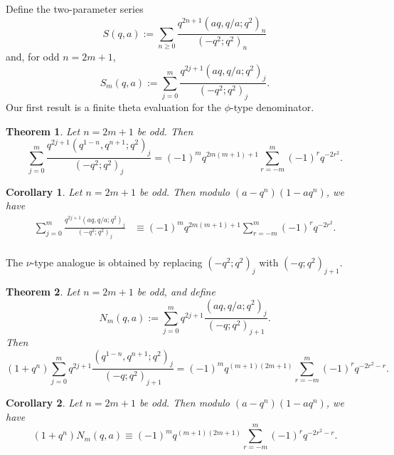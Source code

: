 \documentclass[reqno]{amsart}
\theoremstyle{definition}
\theoremstyle{plain}
\newtheorem{theorem}{Theorem}
\newtheorem{corollary}{Corollary}
\theoremstyle{remark}
\numberwithin{equation}{section}
\begin{document}
Define the two-parameter series
\begin{equation}\label{eq:Sa}
S(q,a):=\sum_{n\ge 0}\frac{q^{2n+1}(aq,q/a;q^2)_n}{(-q^2;q^2)_n}
\end{equation}
and, for odd $n=2m+1$,
\[
S_m(q,a):=\sum_{j=0}^{m}\frac{q^{2j+1}(aq,q/a;q^2)_j}{(-q^2;q^2)_j}.
\]
Our first result is a finite theta evaluation for the $\phi$-type denominator.

\begin{theorem}\label{thm:finite-theta}
Let $n=2m+1$ be odd. Then
\begin{equation}\label{eq:finite-theta}
\sum_{j=0}^{m}\frac{q^{2j+1}(q^{1-n},q^{n+1};q^2)_j}{(-q^2;q^2)_j}
= (-1)^m q^{2m(m+1)+1}\sum_{r=-m}^{m}(-1)^r q^{-2r^2}.
\end{equation}
\end{theorem}

\begin{corollary}\label{cor:microS}
Let $n=2m+1$ be odd. Then modulo $(a-q^n)(1-aq^n)$, we have
\begin{equation}\label{eq:micro-S}
\begin{aligned}
\sum_{j=0}^{m}\frac{q^{2j+1}(aq,q/a;q^2)_j}{(-q^2;q^2)_j}
&\equiv (-1)^m q^{2m(m+1)+1}\sum_{r=-m}^{m}(-1)^r q^{-2r^2}.\\
\end{aligned}
\end{equation}
\end{corollary}

The $\nu$-type analogue is obtained by replacing $(-q^2;q^2)_j$ with $(-q;q^2)_{j+1}$.

\begin{theorem}\label{thm:nu-finite-theta}
Let $n=2m+1$ be odd, and define
\[
N_m(q,a):=\sum_{j=0}^{m} q^{2j+1}\frac{(aq,q/a;q^2)_j}{(-q;q^2)_{j+1}}.
\]
Then
\begin{equation}\label{eq:nu-finite-theta}
(1+q^n)\sum_{j=0}^{m} q^{2j+1}
\frac{(q^{1-n},q^{n+1};q^2)_j}{(-q;q^2)_{j+1}}
=
(-1)^m q^{(m+1)(2m+1)}
\sum_{r=-m}^{m} (-1)^r q^{-2r^2-r}.
\end{equation}
\end{theorem}

\begin{corollary}\label{cor:nu-micro}
Let $n=2m+1$ be odd. Then modulo $(a-q^n)(1-aq^n)$, we have
\begin{equation}\label{eq:nu-micro}
(1+q^n)N_m(q,a)
\equiv
(-1)^m q^{(m+1)(2m+1)}
\sum_{r=-m}^{m} (-1)^r q^{-2r^2-r}.
\end{equation}
\end{corollary}
\end{document}
